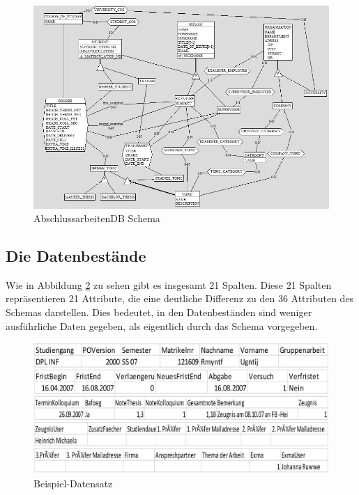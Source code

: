 \begin{figure}[H]
	\centering
	\includegraphics[scale=0.6]{images/01abschlussarbeitendbschema.jpg} 
	\caption{AbschlussarbeitenDB Schema}\label{fig:schema1}
\end{figure}

\subsection{Die Datenbestände}
Wie in Abbildung \ref{fig:schema2} zu sehen gibt es insgesamt 21 Spalten. Diese 21 Spalten repräsentieren 21 Attribute, die eine deutliche Differenz zu den 36 Attributen des Schemas darstellen. Dies bedeutet, in den Datenbeständen sind weniger ausführliche Daten gegeben, als eigentlich durch das Schema vorgegeben. \\

\begin{figure}[H]
	\centering
	\includegraphics[scale=0.3]{images/01beispieldatensatzcsv.jpg} 
	\caption{Beispiel-Datensatz}\label{fig:schema2}
\end{figure}
